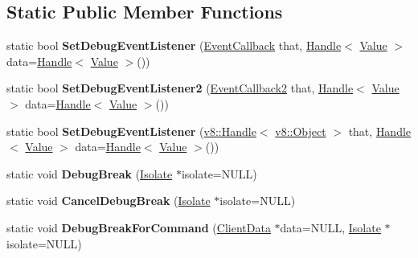 \subsection*{Static Public Member Functions}
\begin{DoxyCompactItemize}
\item 
\hypertarget{classv8_1_1_debug_a745bc83ba29626b64151a1a3e9759e8a}{}static bool {\bfseries Set\+Debug\+Event\+Listener} (\hyperlink{classv8_1_1_debug_a4be52510b70764b730dd1289bd9bbe37}{Event\+Callback} that, \hyperlink{classv8_1_1_handle}{Handle}$<$ \hyperlink{classv8_1_1_value}{Value} $>$ data=\hyperlink{classv8_1_1_handle}{Handle}$<$ \hyperlink{classv8_1_1_value}{Value} $>$())\label{classv8_1_1_debug_a745bc83ba29626b64151a1a3e9759e8a}

\item 
\hypertarget{classv8_1_1_debug_aff46ffb7c2a8e9c6549a7ef74452fce5}{}static bool {\bfseries Set\+Debug\+Event\+Listener2} (\hyperlink{classv8_1_1_debug_aae787219311eeedcbbe2c63cf36d1e53}{Event\+Callback2} that, \hyperlink{classv8_1_1_handle}{Handle}$<$ \hyperlink{classv8_1_1_value}{Value} $>$ data=\hyperlink{classv8_1_1_handle}{Handle}$<$ \hyperlink{classv8_1_1_value}{Value} $>$())\label{classv8_1_1_debug_aff46ffb7c2a8e9c6549a7ef74452fce5}

\item 
\hypertarget{classv8_1_1_debug_a9195f4cb819848a07dc71a5bae43274d}{}static bool {\bfseries Set\+Debug\+Event\+Listener} (\hyperlink{classv8_1_1_handle}{v8\+::\+Handle}$<$ \hyperlink{classv8_1_1_object}{v8\+::\+Object} $>$ that, \hyperlink{classv8_1_1_handle}{Handle}$<$ \hyperlink{classv8_1_1_value}{Value} $>$ data=\hyperlink{classv8_1_1_handle}{Handle}$<$ \hyperlink{classv8_1_1_value}{Value} $>$())\label{classv8_1_1_debug_a9195f4cb819848a07dc71a5bae43274d}

\item 
\hypertarget{classv8_1_1_debug_a4bbac4c6f09faebe196d9403173d1707}{}static void {\bfseries Debug\+Break} (\hyperlink{classv8_1_1_isolate}{Isolate} $\ast$isolate=N\+U\+L\+L)\label{classv8_1_1_debug_a4bbac4c6f09faebe196d9403173d1707}

\item 
\hypertarget{classv8_1_1_debug_ae3177873bb9de871eaa9e7881c8a8e49}{}static void {\bfseries Cancel\+Debug\+Break} (\hyperlink{classv8_1_1_isolate}{Isolate} $\ast$isolate=N\+U\+L\+L)\label{classv8_1_1_debug_ae3177873bb9de871eaa9e7881c8a8e49}

\item 
\hypertarget{classv8_1_1_debug_ab7dba882551c995c484224c7dfebc9bd}{}static void {\bfseries Debug\+Break\+For\+Command} (\hyperlink{classv8_1_1_debug_1_1_client_data}{Client\+Data} $\ast$data=N\+U\+L\+L, \hyperlink{classv8_1_1_isolate}{Isolate} $\ast$isolate=N\+U\+L\+L)\label{classv8_1_1_debug_ab7dba882551c995c484224c7dfebc9bd}


\end{DoxyCompactItemize}
